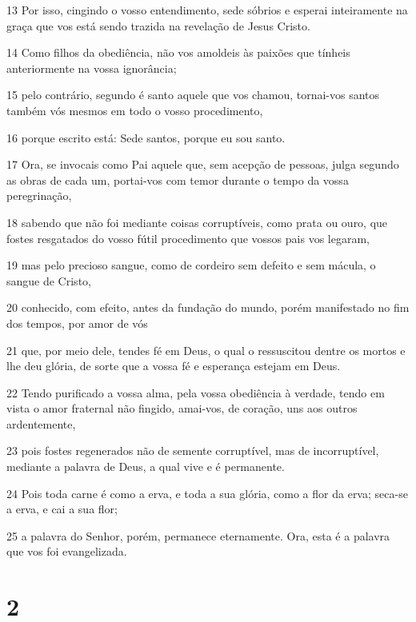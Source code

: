 \par 13 Por isso, cingindo o vosso entendimento, sede sóbrios e esperai inteiramente na graça que vos está sendo trazida na revelação de Jesus Cristo.
\par 14 Como filhos da obediência, não vos amoldeis às paixões que tínheis anteriormente na vossa ignorância;
\par 15 pelo contrário, segundo é santo aquele que vos chamou, tornai-vos santos também vós mesmos em todo o vosso procedimento,
\par 16 porque escrito está: Sede santos, porque eu sou santo.
\par 17 Ora, se invocais como Pai aquele que, sem acepção de pessoas, julga segundo as obras de cada um, portai-vos com temor durante o tempo da vossa peregrinação,
\par 18 sabendo que não foi mediante coisas corruptíveis, como prata ou ouro, que fostes resgatados do vosso fútil procedimento que vossos pais vos legaram,
\par 19 mas pelo precioso sangue, como de cordeiro sem defeito e sem mácula, o sangue de Cristo,
\par 20 conhecido, com efeito, antes da fundação do mundo, porém manifestado no fim dos tempos, por amor de vós
\par 21 que, por meio dele, tendes fé em Deus, o qual o ressuscitou dentre os mortos e lhe deu glória, de sorte que a vossa fé e esperança estejam em Deus.
\par 22 Tendo purificado a vossa alma, pela vossa obediência à verdade, tendo em vista o amor fraternal não fingido, amai-vos, de coração, uns aos outros ardentemente,
\par 23 pois fostes regenerados não de semente corruptível, mas de incorruptível, mediante a palavra de Deus, a qual vive e é permanente.
\par 24 Pois toda carne é como a erva, e toda a sua glória, como a flor da erva; seca-se a erva, e cai a sua flor;
\par 25 a palavra do Senhor, porém, permanece eternamente. Ora, esta é a palavra que vos foi evangelizada.

\chapter{2}

